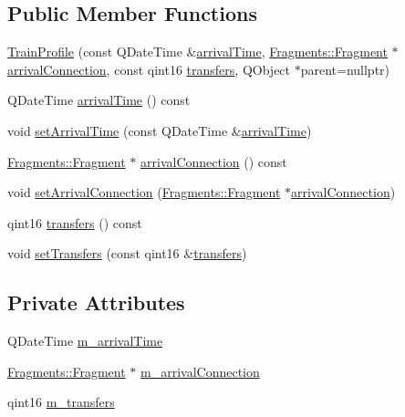 \subsection*{Public Member Functions}
\begin{DoxyCompactItemize}
\item 
\mbox{\hyperlink{classCSA_1_1TrainProfile_ac939a2e59e0b5ef149225af1b1c4b0f9}{Train\+Profile}} (const Q\+Date\+Time \&\mbox{\hyperlink{classCSA_1_1TrainProfile_a3892c881f8a4ce8fd7a9366011ccc4b1}{arrival\+Time}}, \mbox{\hyperlink{classFragments_1_1Fragment}{Fragments\+::\+Fragment}} $\ast$\mbox{\hyperlink{classCSA_1_1TrainProfile_a2a7907625e22799ad36acc22ef23c7ae}{arrival\+Connection}}, const qint16 \mbox{\hyperlink{classCSA_1_1TrainProfile_a9e0520e5ebf6ad00c0462a428300caad}{transfers}}, Q\+Object $\ast$parent=nullptr)
\item 
Q\+Date\+Time \mbox{\hyperlink{classCSA_1_1TrainProfile_a3892c881f8a4ce8fd7a9366011ccc4b1}{arrival\+Time}} () const
\item 
void \mbox{\hyperlink{classCSA_1_1TrainProfile_ae2701384d61bd3ed4dbc7b3b1beeb02e}{set\+Arrival\+Time}} (const Q\+Date\+Time \&\mbox{\hyperlink{classCSA_1_1TrainProfile_a3892c881f8a4ce8fd7a9366011ccc4b1}{arrival\+Time}})
\item 
\mbox{\hyperlink{classFragments_1_1Fragment}{Fragments\+::\+Fragment}} $\ast$ \mbox{\hyperlink{classCSA_1_1TrainProfile_a2a7907625e22799ad36acc22ef23c7ae}{arrival\+Connection}} () const
\item 
void \mbox{\hyperlink{classCSA_1_1TrainProfile_a18c7b5ea923eededaa6965d0e89b1770}{set\+Arrival\+Connection}} (\mbox{\hyperlink{classFragments_1_1Fragment}{Fragments\+::\+Fragment}} $\ast$\mbox{\hyperlink{classCSA_1_1TrainProfile_a2a7907625e22799ad36acc22ef23c7ae}{arrival\+Connection}})
\item 
qint16 \mbox{\hyperlink{classCSA_1_1TrainProfile_a9e0520e5ebf6ad00c0462a428300caad}{transfers}} () const
\item 
void \mbox{\hyperlink{classCSA_1_1TrainProfile_a5507b82c5ef60c32682e662dc6a113f2}{set\+Transfers}} (const qint16 \&\mbox{\hyperlink{classCSA_1_1TrainProfile_a9e0520e5ebf6ad00c0462a428300caad}{transfers}})
\end{DoxyCompactItemize}
\subsection*{Private Attributes}
\begin{DoxyCompactItemize}
\item 
Q\+Date\+Time \mbox{\hyperlink{classCSA_1_1TrainProfile_adba3b60fe32bdd008973662cd4c0a722}{m\+\_\+arrival\+Time}}
\item 
\mbox{\hyperlink{classFragments_1_1Fragment}{Fragments\+::\+Fragment}} $\ast$ \mbox{\hyperlink{classCSA_1_1TrainProfile_ae0987377d3eb8bdedf29c866a8d2a1e3}{m\+\_\+arrival\+Connection}}
\item 
qint16 \mbox{\hyperlink{classCSA_1_1TrainProfile_af0a6f25b6a87259edfe8a4024176d2fd}{m\+\_\+transfers}}
\end{DoxyCompactItemize}



